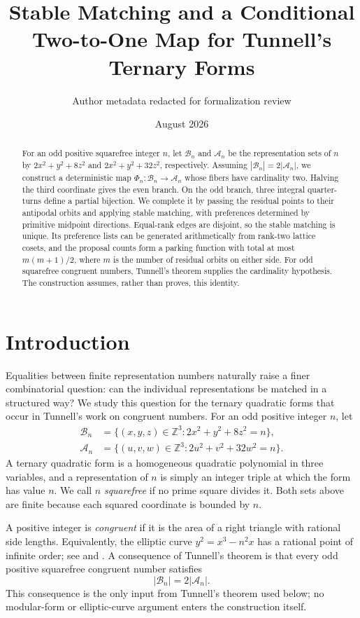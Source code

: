 \documentclass[11pt]{amsart}
\title[A conditional two-to-one map for Tunnell's forms]
{Stable Matching and a Conditional Two-to-One Map
for Tunnell's Ternary Forms}
\author{Author metadata redacted for formalization review}
\author{}
\date{August 2026}
\theoremstyle{definition}
\theoremstyle{remark}
\newcommand{\Z}{\mathbb Z}
\newcommand{\Bn}{\mathcal B_n}
\newcommand{\An}{\mathcal A_n}
\begin{document}
\begin{abstract}
For an odd positive squarefree integer $n$, let $\Bn$ and $\An$ be the
representation sets of $n$ by $2x^2+y^2+8z^2$ and
$2x^2+y^2+32z^2$, respectively.  Assuming $|\Bn|=2|\An|$, we construct a
deterministic map $\Phi_n:\Bn\to\An$ whose fibers have cardinality two.
Halving the third coordinate gives the even branch.  On the odd branch,
three integral quarter-turns define a partial bijection.  We complete it by
passing the residual points to their antipodal orbits and applying stable
matching, with preferences determined by primitive midpoint directions.
Equal-rank edges are disjoint, so the stable matching is unique.  Its
preference lists can be generated arithmetically from rank-two lattice cosets,
and the proposal counts form a parking function with total at most
$m(m+1)/2$, where $m$ is the number of residual orbits on either side.  For
odd squarefree congruent numbers, Tunnell's theorem supplies the cardinality
hypothesis.  The construction assumes, rather than proves, this identity.
\end{abstract}

\maketitle

\section{Introduction}

Equalities between finite representation numbers naturally raise a finer
combinatorial question: can the individual representations be matched in a
structured way?  We study this question for the ternary quadratic forms that
occur in Tunnell's work on congruent numbers.  For an odd positive integer
$n$, let
\begin{align}
 \Bn&=\{(x,y,z)\in\Z^3:2x^2+y^2+8z^2=n\},\label{eq:B-def}\\
 \An&=\{(u,v,w)\in\Z^3:2u^2+v^2+32w^2=n\}.\label{eq:A-def}
\end{align}
A ternary quadratic form is a homogeneous quadratic polynomial in three
variables, and a representation of $n$ is simply an integer triple at which
the form has value $n$.  We call $n$ \emph{squarefree} if no prime square
divides it.  Both sets above are finite because each squared coordinate is
bounded by $n$.

A positive integer is \emph{congruent} if it is the area of a right triangle
with rational side lengths.  Equivalently, the elliptic curve
$y^2=x^3-n^2x$ has a rational point of infinite order; see
\cite[Chap.~I, \S9]{Koblitz} and \cite[pp.~323--324]{Tunnell}.  A consequence
of Tunnell's theorem is that every odd positive squarefree congruent number
satisfies
\begin{equation}\label{eq:Tunnell-balance}
 |\Bn|=2|\An|.
\end{equation}
This consequence is the only input from Tunnell's theorem used below; no
modular-form or elliptic-curve argument enters the construction itself.
\end{document}
